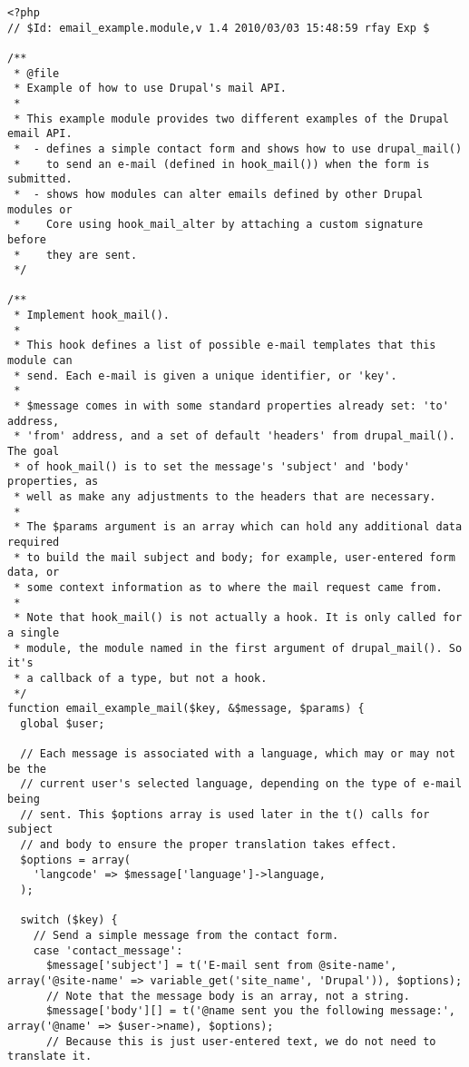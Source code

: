 \documentclass[11pt]{article}
\begin{document}
\begin{verbatim}
<?php
// $Id: email_example.module,v 1.4 2010/03/03 15:48:59 rfay Exp $

/**
 * @file
 * Example of how to use Drupal's mail API.
 *
 * This example module provides two different examples of the Drupal email API.
 *  - defines a simple contact form and shows how to use drupal_mail()
 *    to send an e-mail (defined in hook_mail()) when the form is submitted.
 *  - shows how modules can alter emails defined by other Drupal modules or
 *    Core using hook_mail_alter by attaching a custom signature before
 *    they are sent.
 */

/**
 * Implement hook_mail().
 *
 * This hook defines a list of possible e-mail templates that this module can
 * send. Each e-mail is given a unique identifier, or 'key'.
 *
 * $message comes in with some standard properties already set: 'to' address,
 * 'from' address, and a set of default 'headers' from drupal_mail(). The goal
 * of hook_mail() is to set the message's 'subject' and 'body' properties, as
 * well as make any adjustments to the headers that are necessary.
 *
 * The $params argument is an array which can hold any additional data required
 * to build the mail subject and body; for example, user-entered form data, or
 * some context information as to where the mail request came from.
 *
 * Note that hook_mail() is not actually a hook. It is only called for a single
 * module, the module named in the first argument of drupal_mail(). So it's
 * a callback of a type, but not a hook.
 */
function email_example_mail($key, &$message, $params) {
  global $user;

  // Each message is associated with a language, which may or may not be the
  // current user's selected language, depending on the type of e-mail being
  // sent. This $options array is used later in the t() calls for subject
  // and body to ensure the proper translation takes effect.
  $options = array(
    'langcode' => $message['language']->language,
  );

  switch ($key) {
    // Send a simple message from the contact form.
    case 'contact_message':
      $message['subject'] = t('E-mail sent from @site-name', array('@site-name' => variable_get('site_name', 'Drupal')), $options);
      // Note that the message body is an array, not a string.
      $message['body'][] = t('@name sent you the following message:', array('@name' => $user->name), $options);
      // Because this is just user-entered text, we do not need to translate it.


\end{verbatim}
\end{document}
